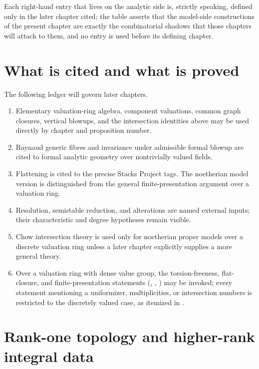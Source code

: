 Each right-hand entry that lives on the analytic side is, strictly
speaking, defined only in the later chapter cited; the table asserts that
the model-side constructions of the present chapter are exactly the
combinatorial shadows that those chapters will attach to them, and no
entry is used before its defining chapter.

\section{What is cited and what is proved}

The following ledger will govern later chapters.
\begin{enumerate}
\item Elementary valuation-ring algebra, component valuations, common graph
  closures, vertical blowups, and the intersection identities above may be
  used directly by chapter and proposition number.
\item Raynaud generic fibres and invariance under admissible formal blowup are
  cited to formal analytic geometry over nontrivially valued fields.
\item Flattening is cited to the precise Stacks Project tags. The
  noetherian model version is distinguished from the general
  finite-presentation argument over a valuation ring.
\item Resolution, semistable reduction, and alterations are named external
  inputs; their characteristic and degree hypotheses remain visible.
\item Chow intersection theory is used only for noetherian proper models over
  a discrete valuation ring unless a later chapter explicitly supplies a
  more general theory.
\item Over a valuation ring with dense value group, the
  torsion-freeness, flat-closure, and finite-presentation statements
  (,
  ,
  ) may be invoked; every
  statement mentioning a uniformizer, multiplicities, or intersection
  numbers is restricted to the discretely valued case, as itemized in
  .
\end{enumerate}

\section{Rank-one topology and higher-rank integral data}
\label{sec:models-higher-rank-integral-data}

